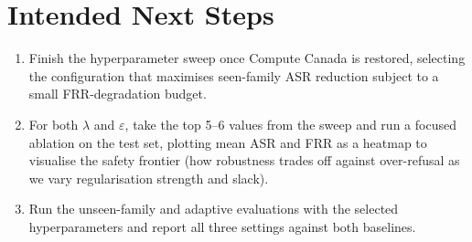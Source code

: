 \documentclass[11pt]{article}
\begin{document}
\section{Intended Next Steps}
\begin{enumerate}
\item Finish the hyperparameter sweep once Compute Canada is restored,
selecting the configuration that maximises seen-family ASR reduction
subject to a small FRR-degradation budget.
\item For both $\lambda$ and $\varepsilon$, take the top 5--6 values from
the sweep and run a focused ablation on the test set, plotting mean ASR and
FRR as a heatmap to visualise the safety frontier (how robustness trades off
against over-refusal as we vary regularisation strength and slack).
\item Run the unseen-family and adaptive evaluations with the selected
hyperparameters and report all three settings against both baselines.
\end{enumerate}
\end{document}
